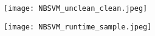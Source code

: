 \documentclass[letterpaper]{article} %
\begin{document}
\begin{center}
\centering
\texttt{[image: NBSVM\_unclean\_clean.jpeg]}
\end{center}

\begin{center}
\centering
\texttt{[image: NBSVM\_runtime\_sample.jpeg]}
\end{center}
\end{document}
